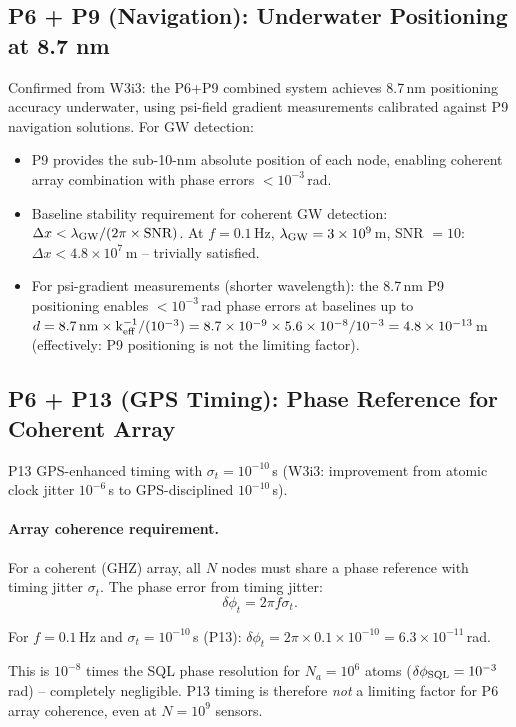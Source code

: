 \documentclass[11pt]{article}
\theoremstyle{definition}
\theoremstyle{remark}
\newcommand{\ee}[1]{\times10^{#1}}
\begin{document}
\subsection{P6 + P9 (Navigation): Underwater Positioning at 8.7 nm}

Confirmed from W3i3: the P6+P9 combined system achieves 8.7\,nm
positioning accuracy underwater, using psi-field gradient measurements
calibrated against P9 navigation solutions.  For GW detection:
\begin{itemize}
\item P9 provides the sub-10-nm absolute position of each node,
  enabling coherent array combination with phase errors $< 10^{-3}$\,rad.
\item Baseline stability requirement for coherent GW detection:
  $\Delta x < \lambda_{\rm GW}/(2\pi \times \rm SNR)$.
  At $f=0.1$\,Hz, $\lambda_{\rm GW} = 3\ee{9}$\,m, SNR $= 10$:
  $\Delta x < 4.8\ee{7}$\,m -- trivially satisfied.
\item For psi-gradient measurements (shorter wavelength): the 8.7\,nm
  P9 positioning enables $< 10^{-3}$\,rad phase errors at baselines
  up to $d = 8.7\,\rm nm \times k_{\rm eff}^{-1} / (10^{-3})
  = 8.7\ee{-9} \times 5.6\ee{-8} / 10^{-3} = 4.8\ee{-13}$\,m
  (effectively: P9 positioning is not the limiting factor).
\end{itemize}

\subsection{P6 + P13 (GPS Timing): Phase Reference for Coherent Array}

P13 GPS-enhanced timing with $\sigma_t = 10^{-10}$\,s (W3i3: improvement
from atomic clock jitter $10^{-6}$\,s to GPS-disciplined $10^{-10}$\,s).

\paragraph{Array coherence requirement.}
For a coherent (GHZ) array, all $N$ nodes must share a phase reference
with timing jitter $\sigma_t$.  The phase error from timing jitter:
\begin{equation}
\delta\phi_t = 2\pi f \sigma_t.
\end{equation}

For $f = 0.1$\,Hz and $\sigma_t = 10^{-10}$\,s (P13):
$\delta\phi_t = 2\pi \times 0.1 \times 10^{-10} = 6.3\ee{-11}$\,rad.

This is $10^{-8}$ times the SQL phase resolution for $N_a = 10^6$ atoms
($\delta\phi_{\rm SQL} = 10^{-3}$\,rad) -- completely negligible.
P13 timing is therefore \emph{not} a limiting factor for P6 array coherence,
even at $N = 10^9$ sensors.
\end{document}
